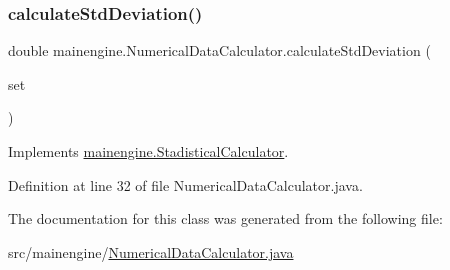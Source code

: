 \subsubsection{\texorpdfstring{calculate\+Std\+Deviation()}{calculateStdDeviation()}}
{\footnotesize\ttfamily double mainengine.\+Numerical\+Data\+Calculator.\+calculate\+Std\+Deviation (\begin{DoxyParamCaption}\item[{Linked\+List$<$ Double $>$}]{set }\end{DoxyParamCaption})}



Implements \hyperlink{interfacemainengine_1_1_stadistical_calculator_a48e42fd096a3f1e8a0740355ddc104c3}{mainengine.\+Stadistical\+Calculator}.



Definition at line 32 of file Numerical\+Data\+Calculator.\+java.



The documentation for this class was generated from the following file\+:\begin{DoxyCompactItemize}
\item 
src/mainengine/\hyperlink{_numerical_data_calculator_8java}{Numerical\+Data\+Calculator.\+java}\end{DoxyCompactItemize}
